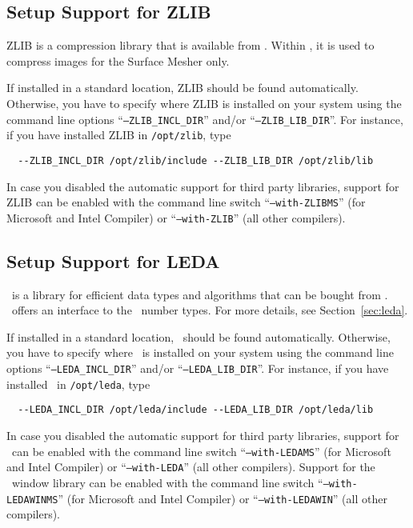 \subsection{Setup Support for ZLIB\label{sec:zlib-setup}}

ZLIB is a compression library that is available from \zlibpage.
Within \cgal, it is used to compress images for the Surface Mesher
only.

If installed in a standard location, ZLIB should be found
automatically.  Otherwise, you have to specify where ZLIB is installed
on your system using the command line options
``\texttt{--ZLIB\_INCL\_DIR}'' and/or ``\texttt{--ZLIB\_LIB\_DIR}''.
For instance, if you have installed ZLIB in \texttt{/opt/zlib}, type
\begin{verbatim}
  --ZLIB_INCL_DIR /opt/zlib/include --ZLIB_LIB_DIR /opt/zlib/lib
\end{verbatim}

In case you disabled the automatic support for third party libraries,
support for ZLIB can be enabled with the command line switch
``\texttt{--with-ZLIBMS}'' (for Microsoft and Intel Compiler) or
``\texttt{--with-ZLIB}'' (all other compilers).

\subsection{Setup Support for LEDA\label{sec:leda-setup}}

\leda\ is a library for efficient data types and algorithms that can
be bought from \ledapage. \cgal\ offers an interface to the
\leda\ number types. For more details, see Section~\ref{sec:leda}.

If installed in a standard location, \leda\ should be found
automatically. Otherwise, you have to specify where \leda\ is
installed on your system using the command line options
``\texttt{--LEDA\_INCL\_DIR}'' and/or ``\texttt{--LEDA\_LIB\_DIR}''.
For instance, if you have installed \leda\ in \texttt{/opt/leda}, type
\begin{verbatim}
  --LEDA_INCL_DIR /opt/leda/include --LEDA_LIB_DIR /opt/leda/lib
\end{verbatim}

In case you disabled the automatic support for third party libraries,
support for \leda\ can be enabled with the command line switch
``\texttt{--with-LEDAMS}'' (for Microsoft and Intel Compiler) or
``\texttt{--with-LEDA}'' (all other compilers). Support for the \leda\
window library can be enabled with the command line switch
``\texttt{--with-LEDAWINMS}'' (for Microsoft and Intel Compiler) or
``\texttt{--with-LEDAWIN}'' (all other compilers).

